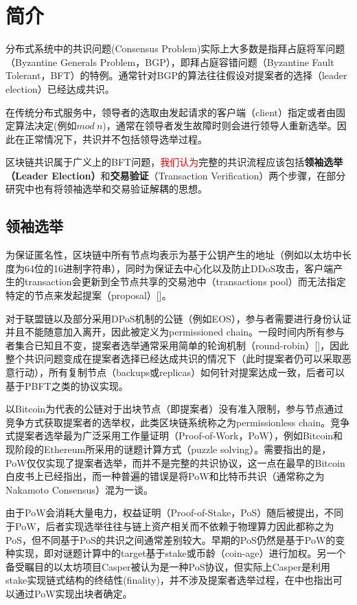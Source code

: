 \section{简介}
分布式系统中的共识问题(Consensus Problem)实际上大多数是指拜占庭将军问题（Byzantine Generals Problem，BGP）\cite{lamport1982byzantine}，即拜占庭容错问题（Byzantine Fault Tolerant，BFT）\cite{pease1980reaching}的特例。通常针对BGP的算法往往假设对提案者的选择（leader election）已经达成共识。

在传统分布式服务中\cite{castro1999practical}，领导者的选取由发起请求的客户端（client）指定或者由固定算法决定(例如$mod\ n$)，通常在领导者发生故障时则会进行领导人重新选举。因此在正常情况下，共识并不包括领导选举过程。

区块链共识属于广义上的BFT问题，\textcolor{red}{我们认为}完整的共识流程应该包括\textbf{领袖选举（Leader Election）}和\textbf{交易验证}（Transaction Verification）两个步骤，在部分研究中也有将领袖选举和交易验证解耦的思想\cite{eyal2016bitcoin,kogias2016enhancing}。

\subsection{领袖选举}
为保证匿名性，区块链中所有节点均表示为基于公钥产生的地址（例如以太坊中长度为64位的16进制字符串），同时为保证去中心化以及防止DDoS攻击，客户端产生的transaction会更新到全节点共享的交易池中（transactions pool）而无法指定特定的节点来发起提案（proposal）[]。

对于联盟链以及部分采用DPoS机制的公链（例如EOS），参与者需要进行身份认证并且不能随意加入离开，因此被定义为permissioned chain。一段时间内所有参与者集合已知且不变，提案者选举通常采用简单的轮询机制（round-robin）[]，因此整个共识问题变成在提案者选择已经达成共识的情况下（此时提案者仍可以采取恶意行动），所有复制节点（backups或replicas）如何针对提案达成一致，后者可以基于PBFT之类的协议实现。

以Bitcoin为代表的公链对于出块节点（即提案者）没有准入限制，参与节点通过竞争方式获取提案者的选举权，此类区块链系统称之为permissionless chain。竞争式提案者选举最为广泛采用工作量证明（Proof-of-Work，PoW），例如Bitcoin和现阶段的Ethereum所采用的谜题计算方式（puzzle solving）。需要指出的是，PoW仅仅实现了提案者选举，而并不是完整的共识协议，这一点在最早的Bitcoin白皮书上已经指出\cite{nakamoto2008bitcoin}，而一种普遍的错误是将PoW和比特币共识（通常称之为Nakamoto Consensus）混为一谈。

由于PoW会消耗大量电力，权益证明（Proof-of-Stake，PoS）随后被提出，不同于PoW，后者实现选举往往与链上资产相关而不依赖于物理算力因此都称之为PoS，但不同基于PoS的共识之间通常差别较大。早期的PoS仍然是基于PoW的变种实现\cite{king2012ppcoin}，即对谜题计算中的target基于stake或币龄（coin-age）进行加权。另一个备受瞩目的以太坊项目Casper\cite{buterin2017casper}被认为是一种PoS协议，但实际上Casper是利用stake实现链式结构的终结性(finality)，并不涉及提案者选举过程，在\cite{buterin2017casper}中也指出可以通过PoW实现出块者确定。

